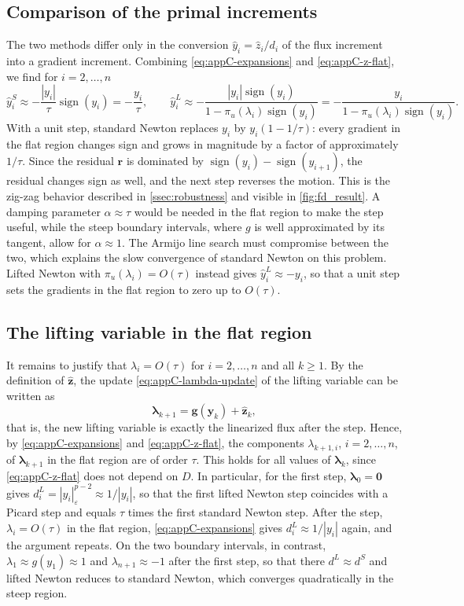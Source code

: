 \documentclass[11pt,pdflatex,sn-mathphys-num]{sn-jnl}
\theoremstyle{thmstyleone}%
\theoremstyle{thmstyletwo}%
\theoremstyle{thmstylethree}%
\newcommand{\bs}[1]{\ensuremath{\boldsymbol{#1}}}
\begin{document}
\subsection{Comparison of the primal increments}
The two methods differ only in the conversion $\hat y_i = \hat z_i/d_i$ of the flux increment into a gradient increment. Combining \eqref{eq:appC-expansions} and \eqref{eq:appC-z-flat}, we find for $i=2,\dots,n$
\begin{equation*}
  \hat{y}_i^S\approx-\frac{|y_i|}{\tau}\operatorname{sign}(y_i)=-\frac{y_i}{\tau},
  \qquad
  \hat{y}_i^L\approx-\frac{|y_i|\operatorname{sign}(y_i)}{1-\pi_u(\lambda_i)\operatorname{sign}(y_i)}=-\frac{y_i}{1-\pi_u(\lambda_i)\operatorname{sign}(y_i)}.
\end{equation*}
With a unit step, standard Newton replaces $y_i$ by $y_i(1-1/\tau)$: every gradient in the flat region changes sign and grows in magnitude by a factor of approximately $1/\tau$. Since the residual $\bs r$ is dominated by $\operatorname{sign}(y_i)-\operatorname{sign}(y_{i+1})$, the residual changes sign as well, and the next step reverses the motion. This is the zig-zag behavior described in \cref{ssec:robustness} and visible in \cref{fig:fd_result}. A damping parameter $\alpha\approx\tau$ would be needed in the flat region to make the step useful, while the steep boundary intervals, where $g$ is well approximated by its tangent, allow for $\alpha\approx1$. The Armijo line search must compromise between the two, which explains the slow convergence of standard Newton on this problem. Lifted Newton with $\pi_u(\lambda_i)=O(\tau)$ instead gives $\hat{y}_i^L\approx-y_i$, so that a unit step sets the gradients in the flat region to zero up to $O(\tau)$.

\subsection{The lifting variable in the flat region}
It remains to justify that $\lambda_i=O(\tau)$ for $i=2,\dots,n$ and all $k\ge1$. By the definition of $\hat{\bs z}$, the update \eqref{eq:appC-lambda-update} of the lifting variable can be written as
\begin{equation*}
  \bs\lambda_{k+1}=\mathbf g(\bs y_k)+\hat{\bs z}_k,
\end{equation*}
that is, the new lifting variable is exactly the linearized flux after the step. Hence, by \eqref{eq:appC-expansions} and  \eqref{eq:appC-z-flat}, the components $\lambda_{k+1,i}$, $i=2,\dots,n$, of $\bs\lambda_{k+1}$ in the flat region are of order $\tau$.
This holds for all values of $\bs\lambda_k$, since \eqref{eq:appC-z-flat} does not depend on $D$. In particular, for the first step, $\bs\lambda_0=\bs 0$ gives $d_i^L=|y_i|_\varepsilon^{p-2}\approx1/|y_i|$, so that the first lifted Newton step coincides with a Picard step and equals $\tau$ times the first standard Newton step. After the step, $\lambda_i=O(\tau)$ in the flat region, \eqref{eq:appC-expansions} gives $d_i^L\approx1/|y_i|$ again, and the argument repeats. On the two boundary intervals, in contrast, $\lambda_1\approx g(y_1)\approx1$ and $\lambda_{n+1}\approx-1$ after the first step, so that there $d^L\approx d^S$ and lifted Newton reduces to standard Newton, which converges quadratically in the steep region.
\end{document}
